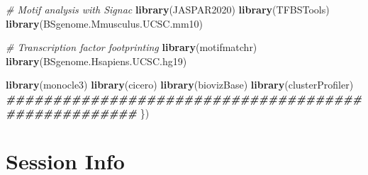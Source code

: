 \documentclass[
  11pt,
  a4paper,
]{article}
\newenvironment{Shaded}{\begin{snugshade}}{\end{snugshade}}
\newcommand{\CommentTok}[1]{\textcolor[rgb]{0.56,0.35,0.01}{\textit{#1}}}
\newcommand{\DocumentationTok}[1]{\textcolor[rgb]{0.56,0.35,0.01}{\textbf{\textit{#1}}}}
\newcommand{\FunctionTok}[1]{\textcolor[rgb]{0.13,0.29,0.53}{\textbf{#1}}}
\newcommand{\NormalTok}[1]{#1}
\begin{document}
\begin{Shaded}
\begin{Highlighting}[]
  \CommentTok{\# Motif analysis with Signac}
  \FunctionTok{library}\NormalTok{(JASPAR2020)}
  \FunctionTok{library}\NormalTok{(TFBSTools)}
  \FunctionTok{library}\NormalTok{(BSgenome.Mmusculus.UCSC.mm10)}
  
  \CommentTok{\# Transcription factor footprinting}
  \FunctionTok{library}\NormalTok{(motifmatchr)}
  \FunctionTok{library}\NormalTok{(BSgenome.Hsapiens.UCSC.hg19)}
  
  \FunctionTok{library}\NormalTok{(monocle3)}
  \FunctionTok{library}\NormalTok{(cicero)}
  \FunctionTok{library}\NormalTok{(biovizBase)}
  \FunctionTok{library}\NormalTok{(clusterProfiler)}
  \DocumentationTok{\#\#\#\#\#\#\#\#\#\#\#\#\#\#\#\#\#\#\#\#\#\#\#\#\#\#\#\#\#\#\#\#\#\#\#\#\#\#\#\#\#\#\#\#\#\#\#\#\#\#\#\#}
\NormalTok{  \})}
\end{Highlighting}
\end{Shaded}

\section{Session Info}\label{session-info}
\end{document}
